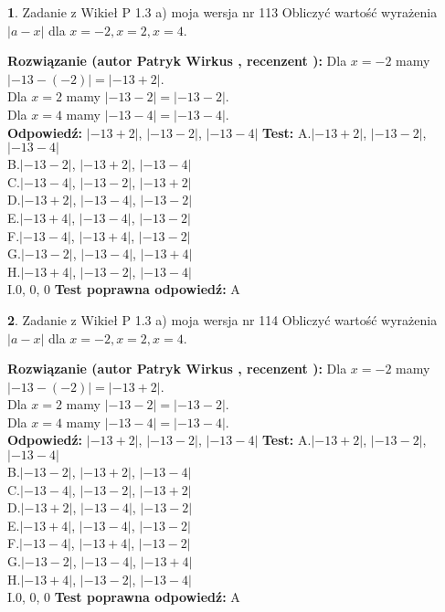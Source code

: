 \documentclass[12pt, a4paper]{article}
\theoremstyle{definition} %
\newtheorem{zad}{}
\newcommand{\zadStart}[1]{\begin{zad}#1\newline}
\newcommand{\zadStop}{\end{zad}}
\newcommand{\rozwStart}[2]{\noindent \textbf{Rozwiązanie (autor #1 , recenzent #2): }\newline}
\newcommand{\rozwStop}{\newline}
\newcommand{\odpStart}{\noindent \textbf{Odpowiedź:}\newline}
\newcommand{\odpStop}{\newline}
\newcommand{\testStart}{\noindent \textbf{Test:}\newline}
\newcommand{\testStop}{\newline}
\newcommand{\kluczStart}{\noindent \textbf{Test poprawna odpowiedź:}\newline}
\newcommand{\kluczStop}{\newline}
\begin{document}
\zadStart{Zadanie z Wikieł P 1.3 a) moja wersja nr 113}
Obliczyć wartość wyrażenia $|a - x|$ dla $x=-2,x=2,x=4$.
\zadStop
\rozwStart{Patryk Wirkus}{}
Dla $x = -2$ mamy $|-13 - (-2)| = |-13 + 2|$.\\
Dla $x = 2$ mamy $|-13 - 2| = |-13 - 2|$.\\
Dla $x = 4$ mamy $|-13 - 4| = |-13 - 4|$.\\
\rozwStop
\odpStart
$|-13 + 2|$, $|-13 - 2|$, $|-13 - 4|$
\odpStop
\testStart
A.$|-13 + 2|$, $|-13 - 2|$, $|-13 - 4|$\\
B.$|-13 - 2|$, $|-13 + 2|$, $|-13 - 4|$\\
C.$|-13 - 4|$, $|-13 - 2|$, $|-13 + 2|$\\
D.$|-13 + 2|$, $|-13 - 4|$, $|-13 - 2|$\\
E.$|-13 + 4|$, $|-13 - 4|$, $|-13 - 2|$\\
F.$|-13 - 4|$, $|-13 + 4|$, $|-13 - 2|$\\
G.$|-13 - 2|$, $|-13 - 4|$, $|-13 + 4|$\\
H.$|-13 + 4|$, $|-13 - 2|$, $|-13 - 4|$\\
I.$0$, $0$, $0$
\testStop
\kluczStart
A
\kluczStop



\zadStart{Zadanie z Wikieł P 1.3 a) moja wersja nr 114}
Obliczyć wartość wyrażenia $|a - x|$ dla $x=-2,x=2,x=4$.
\zadStop
\rozwStart{Patryk Wirkus}{}
Dla $x = -2$ mamy $|-13 - (-2)| = |-13 + 2|$.\\
Dla $x = 2$ mamy $|-13 - 2| = |-13 - 2|$.\\
Dla $x = 4$ mamy $|-13 - 4| = |-13 - 4|$.\\
\rozwStop
\odpStart
$|-13 + 2|$, $|-13 - 2|$, $|-13 - 4|$
\odpStop
\testStart
A.$|-13 + 2|$, $|-13 - 2|$, $|-13 - 4|$\\
B.$|-13 - 2|$, $|-13 + 2|$, $|-13 - 4|$\\
C.$|-13 - 4|$, $|-13 - 2|$, $|-13 + 2|$\\
D.$|-13 + 2|$, $|-13 - 4|$, $|-13 - 2|$\\
E.$|-13 + 4|$, $|-13 - 4|$, $|-13 - 2|$\\
F.$|-13 - 4|$, $|-13 + 4|$, $|-13 - 2|$\\
G.$|-13 - 2|$, $|-13 - 4|$, $|-13 + 4|$\\
H.$|-13 + 4|$, $|-13 - 2|$, $|-13 - 4|$\\
I.$0$, $0$, $0$
\testStop
\kluczStart
A
\kluczStop
\end{document}
